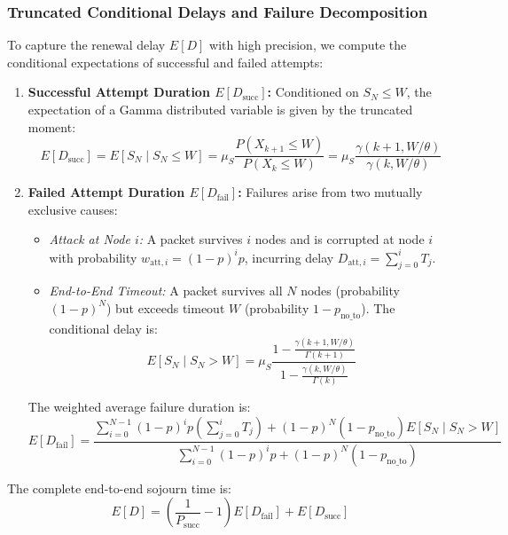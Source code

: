 \documentclass[12pt,onecolumn]{article}
\begin{document}
\subsubsection{Truncated Conditional Delays and Failure Decomposition}
To capture the renewal delay $E[D]$ with high precision, we compute the conditional expectations of successful and failed attempts:
\begin{enumerate}
    \item \textbf{Successful Attempt Duration $E[D_{\text{succ}}]$:} Conditioned on $S_N \le W$, the expectation of a Gamma distributed variable is given by the truncated moment:
    \begin{equation}
    E[D_{\text{succ}}] = E[S_N \mid S_N \le W] = \mu_S \frac{P(X_{k+1} \le W)}{P(X_k \le W)} = \mu_S \frac{\gamma(k+1, W/\theta)}{\gamma(k, W/\theta)}
    \label{eq:truncated_gamma_succ}
    \end{equation}
    \item \textbf{Failed Attempt Duration $E[D_{\text{fail}}]$:} Failures arise from two mutually exclusive causes:
    \begin{itemize}
        \item \textit{Attack at Node $i$:} A packet survives $i$ nodes and is corrupted at node $i$ with probability $w_{\text{att}, i} = (1 - p)^i p$, incurring delay $D_{\text{att}, i} = \sum_{j=0}^i T_j$.
        \item \textit{End-to-End Timeout:} A packet survives all $N$ nodes (probability $(1-p)^N$) but exceeds timeout $W$ (probability $1 - p_{\text{no\_to}}$). The conditional delay is:
        \begin{equation}
        E[S_N \mid S_N > W] = \mu_S \frac{1 - \frac{\gamma(k+1, W/\theta)}{\Gamma(k+1)}}{1 - \frac{\gamma(k, W/\theta)}{\Gamma(k)}}
        \end{equation}
    \end{itemize}
    The weighted average failure duration is:
    \begin{equation}
    E[D_{\text{fail}}] = \frac{\sum_{i=0}^{N-1} (1-p)^i p \left(\sum_{j=0}^i T_j\right) + (1-p)^N (1 - p_{\text{no\_to}}) E[S_N \mid S_N > W]}{\sum_{i=0}^{N-1} (1-p)^i p + (1-p)^N (1 - p_{\text{no\_to}})}
    \end{equation}
\end{enumerate}
The complete end-to-end sojourn time is:
\begin{equation}
E[D] = \left(\frac{1}{P_{\text{succ}}} - 1\right) E[D_{\text{fail}}] + E[D_{\text{succ}}]
\end{equation}
\end{document}
